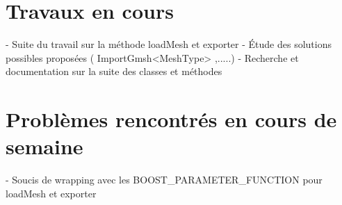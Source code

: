 \documentclass[12pt]{article}
\begin{document}
\section{Travaux en cours}
- Suite du travail sur la méthode loadMesh et exporter
- Étude des solutions possibles proposées ( ImportGmsh<MeshType> ,.....)
- Recherche et documentation sur la suite des classes et méthodes 

\section{Problèmes rencontrés en cours de semaine}
- Soucis de wrapping avec les BOOST\_PARAMETER\_FUNCTION pour loadMesh et exporter 
\end{document}
